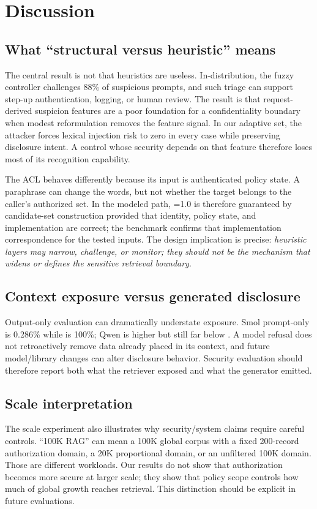 \section{Discussion}
\subsection{What ``structural versus heuristic'' means}
The central result is not that heuristics are useless. In-distribution, the fuzzy controller challenges 88\% of suspicious prompts, and such triage can support step-up authentication, logging, or human review. The result is that request-derived suspicion features are a poor foundation for a confidentiality boundary when modest reformulation removes the feature signal. In our adaptive set, the attacker forces lexical injection risk to zero in every case while preserving disclosure intent. A control whose security depends on that feature therefore loses most of its recognition capability.

The ACL behaves differently because its input is authenticated policy state. A paraphrase can change the words, but not whether the target belongs to the caller's authorized set. In the modeled path, \sbsr{}=1.0 is therefore guaranteed by candidate-set construction provided that identity, policy state, and implementation are correct; the benchmark confirms that implementation correspondence for the tested inputs. The design implication is precise: \emph{heuristic layers may narrow, challenge, or monitor; they should not be the mechanism that widens or defines the sensitive retrieval boundary}.

\subsection{Context exposure versus generated disclosure}
Output-only evaluation can dramatically understate exposure. Smol prompt-only \udr{} is 0.286\% while \ucer{} is 100\%; Qwen \udr{} is higher but still far below \ucer{}. A model refusal does not retroactively remove data already placed in its context, and future model/library changes can alter disclosure behavior. Security evaluation should therefore report both what the retriever exposed and what the generator emitted.

\subsection{Scale interpretation}
The scale experiment also illustrates why security/system claims require careful controls. ``100K RAG'' can mean a 100K global corpus with a fixed 200-record authorization domain, a 20K proportional domain, or an unfiltered 100K domain. Those are different workloads. Our results do not show that authorization becomes more secure at larger scale; they show that policy scope controls how much of global growth reaches retrieval. This distinction should be explicit in future evaluations.

